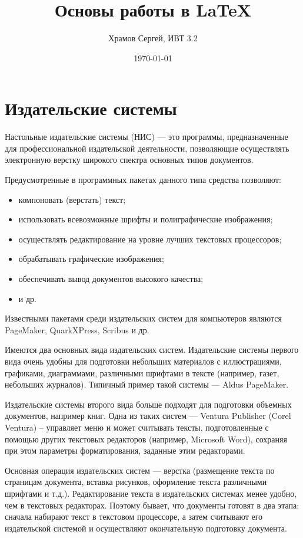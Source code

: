 \documentclass[a4paper,12pt]{article} %
\author{Храмов Сергей, ИВТ 3.2}
\title{Основы работы в \LaTeX}
\date{\today}
\begin{document}
\maketitle
\newpage
\section*{Издательские системы}


\parindent=1cm
\hspace*{1cm} Настольные издательские системы (НИС) — это программы, предназначенные для профессиональной издательской деятельности, позволяющие осуществлять электронную верстку широкого спектра основных типов документов.

Предусмотренные в программных пакетах данного типа средства позволяют:
\begin{itemize}
\item компоновать (верстать) текст;
\item использовать всевозможные шрифты и полиграфические изображения;
\item осуществлять редактирование на уровне лучших текстовых процессоров;
\item обрабатывать графические изображения;
\item обеспечивать вывод документов высокого качества;
\item и др.
\end{itemize}
Известными пакетами среди издательских систем для компьютеров являются PageMaker, QuarkXPress, Scribus и др.

Имеются два основных вида издательских систем. Издательские системы первого вида очень удобны для подготовки небольших материалов с иллюстрациями, графиками, диаграммами, различными шрифтами в тексте (например, газет, небольших журналов). Типичный пример такой системы — Aldus PageMaker.

Издательские системы второго вида больше подходят для подготовки объемных документов, например книг. Одна из таких систем — Ventura Publisher (Corel Ventura) – управляет меню и может считывать тексты, подготовленные с помощью других текстовых редакторов (например, Microsoft Word), сохраняя при этом параметры форматирования, заданные этим редакторами.

Основная операция издательских систем — верстка (размещение текста по страницам документа, вставка рисунков, оформление текста различными шрифтами и т.д.). Редактирование текста в издательских системах менее удобно, чем в текстовых редакторах. Поэтому бывает, что документы готовят в два этапа: сначала набирают текст в текстовом процессоре, а затем считывают его издательской системой и осуществляют окончательную подготовку документа.
\end{document}
